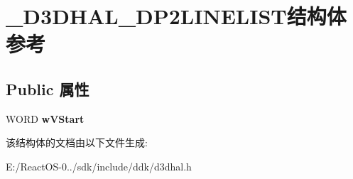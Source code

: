 \hypertarget{struct___d3_d_h_a_l___d_p2_l_i_n_e_l_i_s_t}{}\section{\+\_\+\+D3\+D\+H\+A\+L\+\_\+\+D\+P2\+L\+I\+N\+E\+L\+I\+S\+T结构体 参考}
\label{struct___d3_d_h_a_l___d_p2_l_i_n_e_l_i_s_t}
\subsection*{Public 属性}
\begin{DoxyCompactItemize}
\item 
\mbox{\label{struct___d3_d_h_a_l___d_p2_l_i_n_e_l_i_s_t_a304bfce257cd2e673443c95262d64e45}} 
W\+O\+RD {\bfseries w\+V\+Start}
\end{DoxyCompactItemize}


该结构体的文档由以下文件生成\+:\begin{DoxyCompactItemize}
\item 
E\+:/\+React\+O\+S-\/0../sdk/include/ddk/d3dhal.\+h\end{DoxyCompactItemize}
